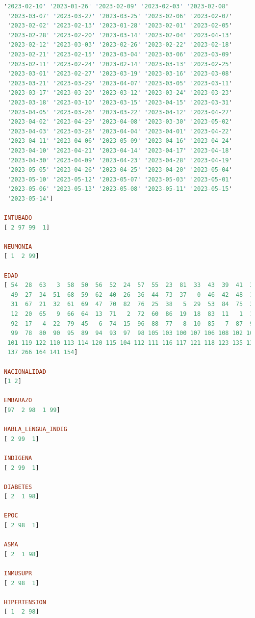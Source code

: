 \begin{lstlisting}[language=haskell, caption=Valores por columna, captionpos=b, label=lst:fiboHaskell]
 '2023-02-10' '2023-01-26' '2023-02-09' '2023-02-03' '2023-02-08'
 '2023-03-07' '2023-03-27' '2023-03-25' '2023-02-06' '2023-02-07'
 '2023-02-02' '2023-02-13' '2023-01-28' '2023-02-01' '2023-02-05'
 '2023-02-28' '2023-02-20' '2023-03-14' '2023-02-04' '2023-04-13'
 '2023-02-12' '2023-03-03' '2023-02-26' '2023-02-22' '2023-02-18'
 '2023-02-21' '2023-02-15' '2023-03-04' '2023-03-06' '2023-03-09'
 '2023-02-11' '2023-02-24' '2023-02-14' '2023-03-13' '2023-02-25'
 '2023-03-01' '2023-02-27' '2023-03-19' '2023-03-16' '2023-03-08'
 '2023-03-21' '2023-03-29' '2023-04-07' '2023-03-05' '2023-03-11'
 '2023-03-17' '2023-03-20' '2023-03-12' '2023-03-24' '2023-03-23'
 '2023-03-18' '2023-03-10' '2023-03-15' '2023-04-15' '2023-03-31'
 '2023-04-05' '2023-03-26' '2023-03-22' '2023-04-12' '2023-04-27'
 '2023-04-02' '2023-04-29' '2023-04-08' '2023-03-30' '2023-05-02'
 '2023-04-03' '2023-03-28' '2023-04-04' '2023-04-01' '2023-04-22'
 '2023-04-11' '2023-04-06' '2023-05-09' '2023-04-16' '2023-04-24'
 '2023-04-10' '2023-04-21' '2023-04-14' '2023-04-17' '2023-04-18'
 '2023-04-30' '2023-04-09' '2023-04-23' '2023-04-28' '2023-04-19'
 '2023-05-05' '2023-04-26' '2023-04-25' '2023-04-20' '2023-05-04'
 '2023-05-10' '2023-05-12' '2023-05-07' '2023-05-03' '2023-05-01'
 '2023-05-06' '2023-05-13' '2023-05-08' '2023-05-11' '2023-05-15'
 '2023-05-14']

INTUBADO
[ 2 97 99  1]

NEUMONIA
[ 1  2 99]

EDAD
[ 54  28  63   3  58  50  56  52  24  57  55  23  81  33  43  39  41  35
  49  27  34  51  68  59  62  40  26  36  44  73  37   0  46  42  48  14
  31  67  21  32  61  69  47  70  82  76  25  38   5  29  53  84  75  30
  12  20  65   9  66  64  13  71   2  72  60  86  19  18  83  11   1  16
  92  17   4  22  79  45   6  74  15  96  88  77   8  10  85   7  87  91
  99  78  80  90  95  89  94  93  97  98 105 103 100 107 106 108 102 109
 101 119 122 110 113 114 120 115 104 112 111 116 117 121 118 123 135 130
 137 266 164 141 154]

NACIONALIDAD
[1 2]

EMBARAZO
[97  2 98  1 99]

HABLA_LENGUA_INDIG
[ 2 99  1]

INDIGENA
[ 2 99  1]

DIABETES
[ 2  1 98]

EPOC
[ 2 98  1]

ASMA
[ 2  1 98]

INMUSUPR
[ 2 98  1]

HIPERTENSION
[ 1  2 98]


\end{lstlisting}
